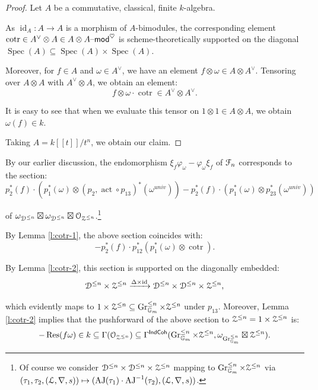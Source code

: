 \documentclass[reqno,11pt]{amsart}
\numberwithin{equation}{subsection}
\theoremstyle{remark}
\newcommand{\xar}[1]{\xrightarrow{#1}}
\newcommand{\bG}{{\mathbb G}}
\newcommand{\sD}{{\EuScript D}}
\newcommand{\sF}{{\EuScript F}}
\newcommand{\sL}{{\EuScript L}}
\newcommand{\sO}{{\EuScript O}}
\newcommand{\sZ}{{\EuScript Z}}
\newcommand{\on}{\operatorname}
\newcommand{\mathendash}{\text{\textendash}}
\newcommand{\Spec}{\on{Spec}}
\newcommand{\id}{\on{id}}
\newcommand{\cotr}{\on{cotr}}
\newcommand{\act}{\on{act}}
\newcommand{\vph}{\varphi}
\newcommand{\Res}{\on{Res}}
\newcommand{\Gr}{\on{Gr}}
\renewcommand{\mod}{\mathendash\mathsf{mod}}
\newcommand{\heart}{\heartsuit}
\newcommand{\IndCoh}{\mathsf{IndCoh}}
\newcommand{\AJ}{\on{AJ}}
\renewcommand{\subset}{\subseteq}
\begin{document}
\begin{proof}

Let $A$ be a commutative, classical, finite $k$-algebra.

As $\id_A:A \to A$ is a morphism of $A$-bimodules,
the corresponding element $\cotr \in A^{\vee} \otimes A \in 
A\otimes A\mod^{\heart}$ is scheme-theoretically 
supported on the diagonal 
$\Spec(A) \subset \Spec(A) \times \Spec(A)$.

Moreover, for $f \in A$ and $\omega \in A^{\vee}$, we
have an element $f \otimes \omega \in A \otimes A^{\vee}$.
Tensoring over $A\otimes A$ with $A^{\vee} \otimes A$,
we obtain an element:
%
\[
f\otimes \omega \cdot \cotr \in A^{\vee} \otimes A^{\vee}.
\]

\noindent It is easy to see that when we evaluate this
tensor on $1 \otimes 1 \in A \otimes A$, we obtain
$\omega(f) \in k$.

Taking $A = k[[t]]/t^n$, we obtain our claim.

\end{proof}

By our earlier discussion, the endomorphism 
$\xi_f \vph_{\omega}-\vph_{\omega}\xi_f$ of $\sF_n$
corresponds to the section:
%
\[
p_2^*(f) \cdot 
(p_1^*(\omega) \otimes (p_2,\act \circ p_{13})^*(\omega^{univ})) -
p_2^*(f) \cdot 
(p_1^*(\omega) \otimes p_{23}^*(\omega^{univ}))
\]

\noindent of $\omega_{\sD^{\leq n}} \boxtimes 
\omega_{\sD^{\leq n}} \boxtimes \sO_{\sZ^{\leq n}}$.\footnote{Of 
course we consider
$\sD^{\leq n} \times \sD^{\leq n} \times
\sZ^{\leq n}$ mapping to $\Gr_{\bG_m}^{\leq n} \times \sZ^{\leq n}$
via $(\tau_1,\tau_2,(\sL,\nabla,s)) \mapsto 
(\AJ(\tau_1)\cdot\AJ^{-1}(\tau_2),(\sL,\nabla,s))$.}

By Lemma \ref{l:cotr-1}, the above section coincides with:
%
\[
-p_2^*(f) \cdot p_{12}^*(p_1^*(\omega)\otimes\cotr).
\]

\noindent By Lemma \ref{l:cotr-2}, this section is supported
on the diagonally embedded:
%
\[
\sD^{\leq n} \times \sZ^{\leq n} 
\xar{\Delta \times \id} 
\sD^{\leq n} \times \sD^{\leq n} \times \sZ^{\leq n},
\]
 
\noindent which evidently
maps to $1 \times \sZ^{\leq n} \subset \Gr_{\bG_m}^{\leq n} \times \sZ^{\leq n}$
under $p_{13}$. Moreover, Lemma \ref{l:cotr-2} implies that the
pushforward of the above section to $\sZ^{\leq n} = 1 \times \sZ^{\leq n}$
is: 
%
\[
-\Res(f\omega) \in k \subset \Gamma(\sO_{\sZ^{\leq n}}) \subset 
\Gamma^{\IndCoh}(\Gr_{\bG_m}^{\leq n} \times \sZ^{\leq n}, 
\omega_{\Gr_{\bG_m}^{\leq n}} \boxtimes \sZ^{\leq n}).
\]
\end{document}

